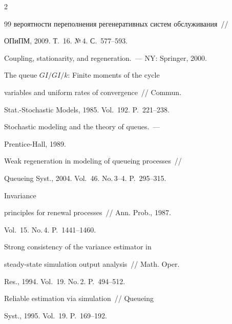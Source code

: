 \begin{multicols}{2}
{{\begin{thebibliography}{99}
вероятности переполнения  регенеративных систем обслуживания~//

ОПиПМ, 2009. Т.~16. №\,4. С.~577--593.










  Coupling, stationarity, and regeneration.~--- NY: Springer, 2000.




 The queue $GI/GI/k$:  Finite moments of the cycle

variables and uniform rates of convergence~// Commun.

Stat.-Stochastic Models, 1985. Vol.~192. P.~221--238.




   Stochastic modeling and the theory of queues.~---

Prentice-Hall, 1989.




 Weak regeneration in modeling of queueing processes~// 

Queueing  Syst., 2004.  Vol.~46. No.\,3--4. P.~295--315.




 Invariance

principles for renewal processes~//  Ann. Prob., 1987.

Vol.~15. No.\,4. P.~1441--1460.




 Strong consistency of the variance estimator in

steady-state simulation output analysis~// Math. Oper.

Res., 1994. Vol.~19. No.\,2. P.~494--512.




 Reliable estimation via simulation~// Queueing

Syst., 1995. Vol.~19. P.~169--192.






\end{thebibliography}}}
\end{multicols}
